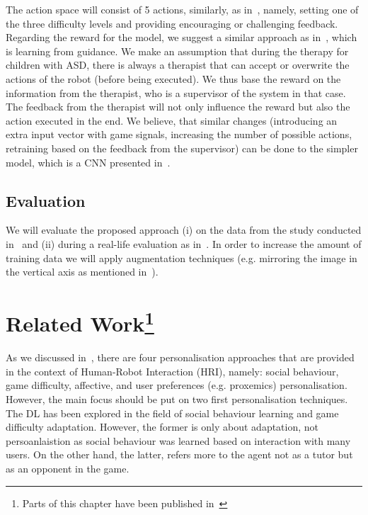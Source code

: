 \documentclass[thesis]{mas_proposal}
\begin{document}
The action space will consist of 5 actions, similarly, as in~\cite{tsiakas2018task,stolarz2022learningbased,stolarz2022personalisedrobot}, namely, setting one of the three difficulty levels and providing encouraging or challenging feedback. Regarding the reward for the model, we suggest a similar approach as in~\cite{senft2017supervised}, which is learning from guidance. We make an assumption that during the therapy for children with ASD, there is always a therapist that can accept or overwrite the actions of the robot (before being executed). We thus base the reward on the information from the therapist, who is a supervisor of the system in that case. The feedback from the therapist will not only influence the reward but also the action executed in the end. We believe, that similar changes (introducing an extra input vector with game signals, increasing the number of possible actions, retraining based on the feedback from the supervisor) can be done to the simpler model, which is a CNN presented in~\cite{Romeo2018,Romeo2019}.

\subsection{Evaluation}
We will evaluate the proposed approach (i) on the data from the study conducted in~\cite{stolarz2022learningbased,stolarz2022personalisedrobot} and (ii) during a real-life evaluation as in~\cite{Qureshi2016,romeo2021human}. In order to increase the amount of training data we will apply augmentation techniques (e.g. mirroring the image in the vertical axis as mentioned in~\cite{romeo2021human}).

\section[Related Work]{Related Work\footnote{Parts of this chapter have been published in~\cite{stolarz2022personalized}}}

As we discussed in~\cite{stolarz2022personalized}, there are four personalisation approaches that are provided in the context of Human-Robot Interaction (HRI), namely: social behaviour, game difficulty, affective, and user preferences (e.g. proxemics) personalisation. However, the main focus should be put on two first personalisation techniques. The DL has been explored in the field of social behaviour learning and game difficulty adaptation. However, the former is only about adaptation, not persoanlaistion as social behaviour was learned based on interaction with many users. On the other hand, the latter, refers more to the agent not as a tutor but as an opponent in the game.
\end{document}

